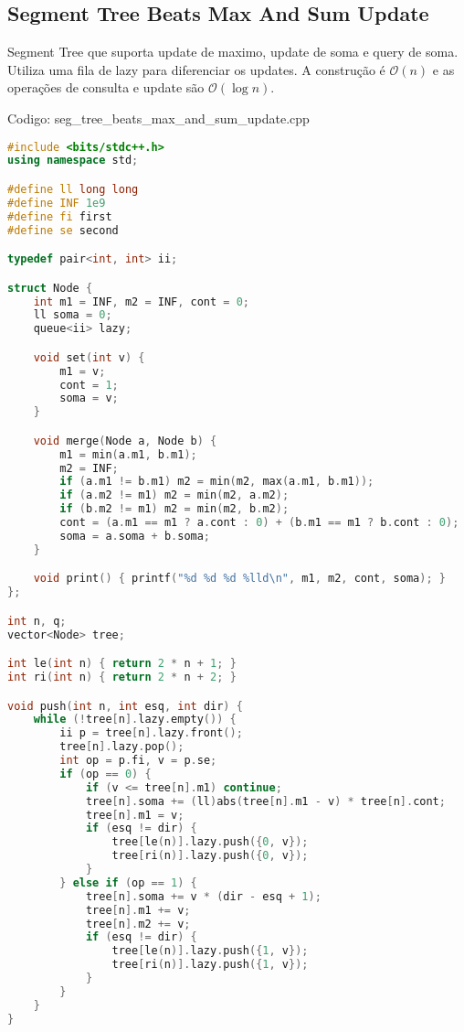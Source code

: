 \documentclass[10pt, a4paper, oneside]{book}
\begin{document}
\subsection{Segment Tree Beats Max And Sum Update}


Segment Tree que suporta update de maximo, update de soma e query de soma. Utiliza uma fila de lazy para diferenciar os updates. A construção é $\mathcal{O}(n)$ e as operações de consulta e update são $\mathcal{O}(\log n)$.
\hfill

Codigo: seg\_tree\_beats\_max\_and\_sum\_update.cpp

\begin{lstlisting}[language=C++]
#include <bits/stdc++.h>
using namespace std;

#define ll long long
#define INF 1e9
#define fi first
#define se second

typedef pair<int, int> ii;

struct Node {
    int m1 = INF, m2 = INF, cont = 0;
    ll soma = 0;
    queue<ii> lazy;

    void set(int v) {
        m1 = v;
        cont = 1;
        soma = v;
    }

    void merge(Node a, Node b) {
        m1 = min(a.m1, b.m1);
        m2 = INF;
        if (a.m1 != b.m1) m2 = min(m2, max(a.m1, b.m1));
        if (a.m2 != m1) m2 = min(m2, a.m2);
        if (b.m2 != m1) m2 = min(m2, b.m2);
        cont = (a.m1 == m1 ? a.cont : 0) + (b.m1 == m1 ? b.cont : 0);
        soma = a.soma + b.soma;
    }

    void print() { printf("%d %d %d %lld\n", m1, m2, cont, soma); }
};

int n, q;
vector<Node> tree;

int le(int n) { return 2 * n + 1; }
int ri(int n) { return 2 * n + 2; }

void push(int n, int esq, int dir) {
    while (!tree[n].lazy.empty()) {
        ii p = tree[n].lazy.front();
        tree[n].lazy.pop();
        int op = p.fi, v = p.se;
        if (op == 0) {
            if (v <= tree[n].m1) continue;
            tree[n].soma += (ll)abs(tree[n].m1 - v) * tree[n].cont;
            tree[n].m1 = v;
            if (esq != dir) {
                tree[le(n)].lazy.push({0, v});
                tree[ri(n)].lazy.push({0, v});
            }
        } else if (op == 1) {
            tree[n].soma += v * (dir - esq + 1);
            tree[n].m1 += v;
            tree[n].m2 += v;
            if (esq != dir) {
                tree[le(n)].lazy.push({1, v});
                tree[ri(n)].lazy.push({1, v});
            }
        }
    }
}


\end{lstlisting}
\end{document}
